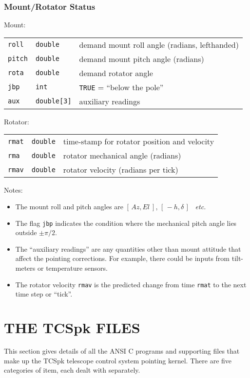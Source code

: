\documentclass[12pt,fleqn,twoside]{article}
\renewcommand{\_}{{\tt\char'137}}     %
\newcommand{\mhadec}     {$[\,-h,\delta\,]$}
\newcommand{\azel}      {$[\,Az,El~]$}
\newcommand{\notelist}  {\goodbreak \vspace{1ex} Notes:
                        \vspace{-3ex}}
\begin{document}
\subsubsection{Mount/Rotator Status}
Mount:

\begin{tabular}{lll}
{\tt roll} & {\tt double} & demand mount roll angle (radians, lefthanded) \\
{\tt pitch} & {\tt double} & demand mount pitch angle (radians) \\
{\tt rota} & {\tt double} & demand rotator angle \\
{\tt jbp} & {\tt int} & {\tt TRUE} = ``below the pole'' \\
{\tt aux } & {\tt double[3]} & auxiliary readings \\
\end{tabular}

Rotator:

\begin{tabular}{lll}
{\tt rmat} & {\tt double} & time-stamp for rotator position and velocity \\
{\tt rma} & {\tt double} & rotator mechanical angle (radians) \\
{\tt rmav} & {\tt double} & rotator velocity (radians per tick) \\
\end{tabular}

\notelist
\begin{itemize}
\item The mount roll and pitch angles are \azel, \mhadec\ {\it
      etc.} \item The flag {\tt jbp} indicates the condition where the
      mechanical pitch angle lies outside $\pm\pi/2$. \item The
      ``auxiliary readings'' are any quantities other than mount
      attitude that affect the pointing corrections.  For example,
      there could be inputs from tilt-meters or temperature sensors.
\item The rotator velocity {\tt rmav} is the predicted change from
      time {\tt rmat} to the next time step or ``tick''.
\end{itemize}

\newpage
\fi

\section{THE TCSpk FILES}

This section gives details of all the ANSI C programs
and supporting files that make up the TCSpk
telescope control system pointing kernel.  There are five categories
of item, each dealt with separately.
\end{document}
